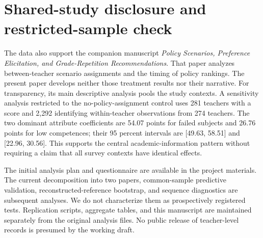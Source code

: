 \section{Shared-study disclosure and restricted-sample check}\label{app:scope}
\begin{addition}
The data also support the companion manuscript \textit{Policy Scenarios, Preference Elicitation, and Grade-Repetition Recommendations}. That paper analyzes between-teacher scenario assignments and the timing of policy rankings. The present paper develops neither those treatment results nor their narrative. For transparency, its main descriptive analysis pools the study contexts. A sensitivity analysis restricted to the no-policy-assignment control uses 281 teachers with a score and 2,292 identifying within-teacher observations from 274 teachers. The two dominant attribute coefficients are 54.07 points for failed subjects and 26.76 points for low competences; their 95 percent intervals are [49.63, 58.51] and [22.96, 30.56]. This supports the central academic-information pattern without requiring a claim that all survey contexts have identical effects.

The initial analysis plan and questionnaire are available in the project materials. The current decomposition into two papers, common-sample predictive validation, reconstructed-reference bootstrap, and sequence diagnostics are subsequent analyses. We do not characterize them as prospectively registered tests. Replication scripts, aggregate tables, and this manuscript are maintained separately from the original analysis files. No public release of teacher-level records is presumed by the working draft.
\end{addition}

